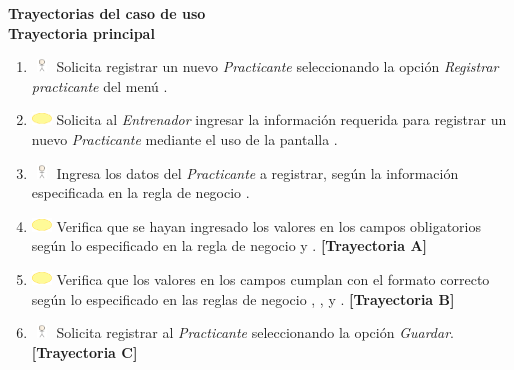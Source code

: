 \textbf{\textcolor[rgb]{0, 0, 0.545098}{Trayectorias del caso de uso}} \\

\textbf{\large{Trayectoria principal}}

\begin{enumerate}
	\item \includegraphics[width=15pt, height=10pt]{./Figuras/iconosCU/usuario.png} Solicita registrar un nuevo \textit{Practicante} seleccionando la opción \textit{Registrar practicante} del menú .
	\item \includegraphics[width=15pt]{./Figuras/iconosCU/herramienta.png} Solicita al \textit{Entrenador} ingresar la información requerida para registrar un nuevo \textit{Practicante} mediante el uso de la pantalla .
	\item \includegraphics[width=15pt, height=10pt]{./Figuras/iconosCU/usuario.png} Ingresa los datos del \textit{Practicante} a registrar, según la información especificada en la regla de negocio .
	\item \includegraphics[width=15pt]{./Figuras/iconosCU/herramienta.png} Verifica que se hayan ingresado los valores en los campos obligatorios según lo especificado en la regla de negocio  y . \textbf{[Trayectoria A]} 
	\item \includegraphics[width=15pt]{./Figuras/iconosCU/herramienta.png} Verifica que los valores en los campos cumplan con el formato correcto según lo especificado en las reglas de negocio , ,  y . \textbf{[Trayectoria B]}
	\item \includegraphics[width=15pt, height=10pt]{./Figuras/iconosCU/usuario.png} Solicita registrar al \textit{Practicante} seleccionando la opción \textit{Guardar}. \textbf{[Trayectoria C]}

\end{enumerate}
